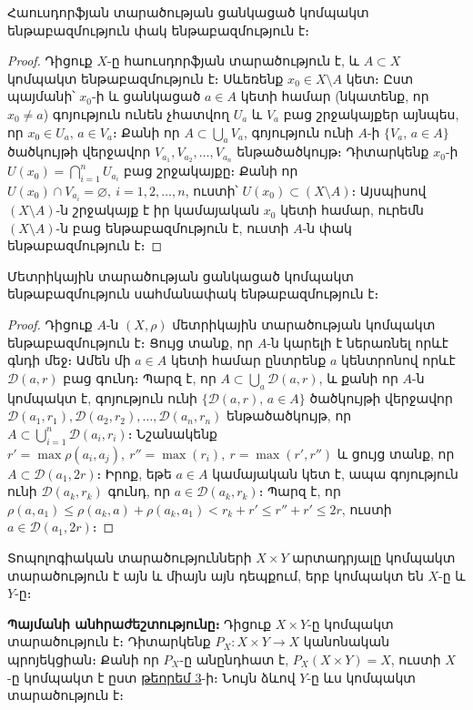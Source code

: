 \documentclass[./main.tex]{subfiles}
\begin{document}
\begin{theorem}\label{ch17thm5} \label{թեորեմ 5}
Հաուսդորֆյան տարածության ցանկացած կոմպակտ են\-թա\-բազ\-մու\-թյուն փակ ենթաբազմություն է։
\end{theorem} %
\begin{proof}
Դիցուք $X$-ը հաուսդորֆյան տարածություն է, և $A\subset X$ կոմպակտ ենթաբազմություն է։ Սևեռենք $x_0 \in X\setminus A$ կետ։ Ըստ պայմանի՝ $x_0$-ի և ցանկա\-ցած $a\in A$ կետի համար (նկատենք, որ $x_0\neq a$) գոյություն ունեն չհատվող $U_a$ և $V_a$ բաց շրջակայքեր այնպես, որ $x_0 \in U_a,\, a \in V_a$։ Քանի որ $A\subset \bigcup\limits_a V_a$, գոյություն ունի $A$-ի $\{V_a,\, a\in A\}$ ծածկույթի վերջավոր $V_{a_1},V_{a_2},\dots,V_{a_n}$ ենթածածկույթ։ Դիտարկենք $x_0\textrm{-ի}$ ${U(x_0)=\bigcap\limits_{i=1}^nU_{a_i}}$  բաց շրջակայքը։ Քանի որ $U(x_0)\cap V_{a_i}=\varnothing, \ i=1,2,\dots,n$, ուստի՝ $U(x_0)\subset (X\setminus A)$։ Այսպիսով $(X\setminus A)$-ն շրջակայք է իր կամայական $x_0$ կետի համար, ուրեմն $(X\setminus A)$-ն բաց ենթաբազմություն է, ուստի $A$-ն փակ ենթաբազմություն է։
\end{proof}

\begin{theorem}\label{ch17thm6}\label{թեորեմ 6}
Մետրիկային տարածության ցանկացած կոմպակտ ենթաբազմու\-թյուն սահմանափակ ենթաբազմու\-թյուն է։
\end{theorem} %

\begin{proof}
Դիցուք $A$-ն $(X,\rho)$ մետրիկային տարածության կոմպակտ են\-թա\-բազ\-մու\-թյուն է։ Ցույց տանք, որ $A$-ն կարելի է ներառնել որևէ գնդի մեջ։ Ամեն մի ${a\in A}$ կետի համար ընտրենք $a$ կենտրոնով որևէ $\mathcal{D}(a,r)$ բաց գունդ։ Պարզ է, որ ${A\subset \bigcup\limits_a \mathcal{D}(a,r)}$, և քանի որ $A$-ն կոմպակտ է, գոյություն ունի ${\{\mathcal{D}(a,r),\, a\in A\} }$ ծած\-կույթի վերջավոր $\mathcal{D} (a_1,r_1), \mathcal{D}(a_2,r_2 ),\dots,\mathcal{D}(a_n,r_n)$ ենթածածկույթ, որ $A\subset {\bigcup\limits_{i=1}^n \mathcal{D}(a_i,r_i)}$։ Նշանակենք $r'=\max \rho(a_i,a_j),\ r''=\max(r_i),\ r=\max(r',r'')$ և ցույց տանք, որ $A\subset \mathcal{D}(a_1,2r)$։ Իրոք, եթե $a\in A$ կամայական կետ է, ապա գոյություն ունի $\mathcal{D}(a_k,r_k )$ գունդ, որ $a\in \mathcal{D}(a_k,r_k)$։ Պարզ է, որ $\rho(a,a_1)\leq \rho(a_k,a)+\rho(a_k,a_1)<r_k+r' \leq r''+r'\leq 2r $, ուստի $a\in \mathcal{D}(a_1,2r)$։
\end{proof}
\begin{theorem}\label{ch17thm7}
Տոպոլոգիական տարածությունների $X\times Y$ արտադրյալը կոմպակտ տարածություն է այն և միայն այն դեպքում, երբ կոմպակտ են $X$-ը և $Y$-ը։
\end{theorem}%
\label{թեորեմ 7}
\textbf{Պայմանի անհրաժեշտությունը։} Դիցուք ${X\times Y}$-ը կոմպակտ տարածություն է։ Դիտարկենք ${P_X:X\times Y\rightarrow X}$ կանոնական պրոյեկցիան։ Քանի որ $P_X$-ը անընդհատ է, ${P_X (X\times Y)=X}$, ուստի $X$-ը կոմպակտ է ըստ \hyperref[թեորեմ 3]{թեորեմ 3}-ի։ Նույն ձևով $Y$-ը ևս կոմպակտ տարածություն է։
\end{document}
